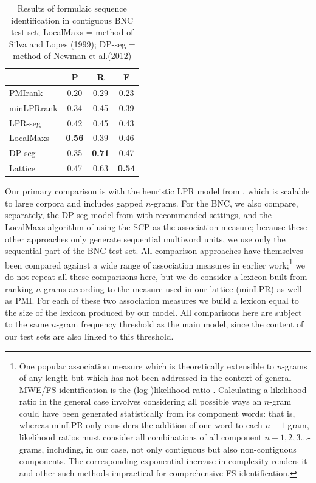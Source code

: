 \documentclass[11pt,letterpaper]{article}
\makeatletter
\def \al {al.\@ }
\makeatother
\begin{document}
 \begin{table}[!bt]
 
 \begin{center}
  \caption{ Results of formulaic sequence identification in contiguous BNC test set; LocalMaxs = method of Silva and Lopes (1999); DP-seg = method of Newman et \al (2012)}
	\label{tab:BNC}
	
	 \begin{tabular}{lccc}

       \hline
			& P & R & F\\
			 \hline
			PMIrank & 0.20 & 0.29 & 0.23 \\
			minLPRrank & 0.34 & 0.45 & 0.39 \\
			LPR-seg & 0.42 & 0.45 & 0.43 \\
			LocalMaxs & \bf{0.56} & 0.39 & 0.46 \\
			DP-seg & 0.35 & \bf{0.71} & 0.47 \\
			Lattice & 0.47 & 0.63 & \bf{0.54} \\
       \hline
 \end{tabular}

 \end{center}

 \end{table}	



Our primary comparison is with the heuristic LPR model from , which is scalable to large corpora and includes gapped $n$-grams. For the BNC, we also compare, separately, the DP-seg model from  with recommended settings, and the LocalMaxs algorithm of  using the SCP as the association measure; because these other approaches only generate sequential multiword units, we use only the sequential part of the BNC test set. All comparison approaches have themselves been compared against a wide range of association measures in earlier work;\footnote{One popular association measure which is theoretically extensible to $n$-grams of any length but which has not been addressed in the context of general MWE/FS identification is the (log-)likelihood ratio \cite{Dunning93}. Calculating a likelihood ratio in the general case involves considering all possible ways an $n$-gram could have been generated statistically from its component words: that is, whereas minLPR only considers the addition of one word to each $n-1$-gram, likelihood ratios must consider all combinations of all component $n-1,2,3\ldots$-grams, including, in our case, not only contiguous but also non-contiguous components. The corresponding exponential increase in complexity renders it and other such methods impractical for comprehensive FS identification.} we do not repeat all these comparisons here, but we do consider a lexicon built from ranking $n$-grams according to the measure used in our lattice (minLPR) as well as PMI. For each of these two association measures we build a lexicon equal to the size of the lexicon produced by our model. All comparisons here are subject to the same $n$-gram frequency threshold as the main model, since the content of our test sets are also linked to this threshold.
\end{document}
